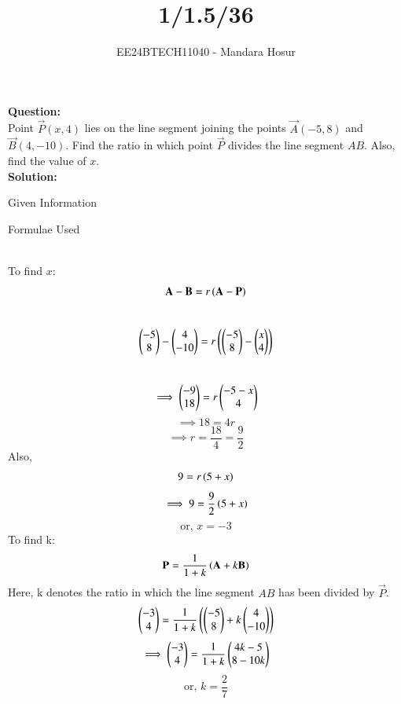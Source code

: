 \documentclass[journal]{IEEEtran}
\begin{document}

\vspace{3cm}

\title{1/1.5/36}
\author{EE24BTECH11040 - Mandara Hosur}
{\let\newpage\relax\maketitle}

\renewcommand{\thefigure}{\theenumi}
\renewcommand{\thetable}{\theenumi}
\setlength{\intextsep}{10pt} %


\renewcommand{\thetable}{\theenumi}


\textbf{Question:}\\
Point $\vec{P}(x,4)$ lies on the line segment joining the points $\vec{A}(-5,8)$ and $\vec{B}(4,-10)$. Find the ratio in which point $\vec{P}$ divides the line segment $AB$. Also, find the value of $x$.
\\
\textbf{Solution:}
\begin{table}[h!]    
  \centering
  
  \caption{Given Information}
  \label{Table 1}
\end{table}
\begin{table}[h!]
    \centering
    
    \caption{Formulae Used}
    \label{Table 2}
\end{table} \\
To find $x$: $$\mathbf{A}-\mathbf{B}=r\left(\mathbf{A}-\mathbf{P}\right)$$ \\
$$\begin{pmatrix}-5\\8\end{pmatrix} - \begin{pmatrix}4\\-10\end{pmatrix} = r\left(\begin{pmatrix}-5\\8\end{pmatrix} - \begin{pmatrix}x\\4\end{pmatrix}\right)$$\\
$$\implies \begin{pmatrix}-9\\18\end{pmatrix} = r\begin{pmatrix}-5-x\\4\end{pmatrix}$$
$$\implies 18=4r$$
$$\implies r=\frac{18}{4}=\frac{9}{2}$$
Also, $$9=r\left(5+x\right)$$
$$\implies 9=\frac{9}{2}\left(5+x\right)$$
$$\text{or, }x=-3$$
To find k: $$\mathbf{P}=\frac{1}{1+k}\left(\mathbf{A}+k\mathbf{B}\right)$$
Here, k denotes the ratio in which the line segment $AB$ has been divided by $\vec{P}$.
$$\begin{pmatrix}-3\\4\end{pmatrix}=\frac{1}{1+k}\left(\begin{pmatrix}-5\\8\end{pmatrix}+k\begin{pmatrix}4\\-10\end{pmatrix}\right)$$
$$\implies \begin{pmatrix}-3\\4\end{pmatrix}=\frac{1}{1+k}\begin{pmatrix}4k-5\\8-10k\end{pmatrix}$$
$$\text{or, }k=\frac{2}{7}$$
\end{document}
